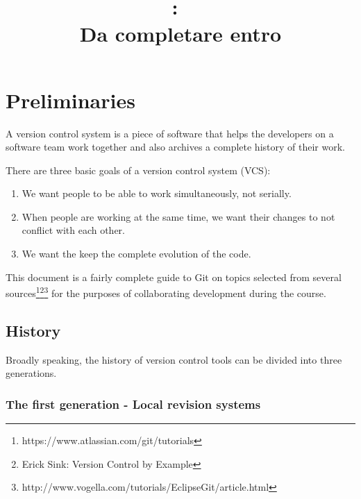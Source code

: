 \documentclass{article}
\title{
\vspace{2in}
\textmd{\textbf{\hmwkClass:\ \hmwkTitle}}\\
\normalsize\vspace{0.1in}\small{Da completare entro \hmwkDueDate}\\
\vspace{0.1in}\large{\textit{\hmwkClassInstructor}}
\vspace{3in}
}
\author{\textbf{\hmwkAuthorName}}
\date{} %
\begin{document}
\maketitle



\newpage
\tableofcontents
\newpage




 \section{Preliminaries}

A version control system is a piece of software that helps the
developers on a software team work together and also archives a
complete history of their work.

There are three basic goals of a version control system (VCS):

\begin{enumerate}
\item We want people to be able to work simultaneously, not serially.
\item When people are working at the same time, we want their changes
  to not conflict with each other.
\item We want the keep the complete evolution of the code.
\end{enumerate}

This document is a fairly complete guide to Git on topics selected
from several
sources\footnote{https://www.atlassian.com/git/tutorials}\footnote{Erick
  Sink: Version Control by
  Example}\footnote{http://www.vogella.com/tutorials/EclipseGit/article.html}
for the purposes of collaborating development during the course.

\subsection*{History}
Broadly speaking, the history of version control tools can be divided
into three generations.

\subsubsection*{The first generation - Local revision systems}
\end{document}

